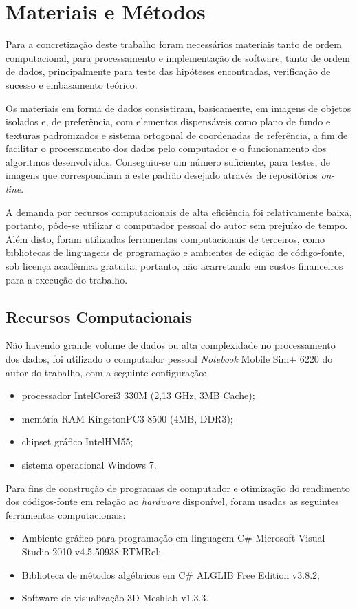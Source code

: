 \chapter{Materiais e Métodos}
	\label{materiaisEMetodos}

	Para a concretização deste trabalho foram necessários materiais tanto de ordem computacional, para processamento e implementação de software, tanto de ordem de dados, principalmente para teste das hipóteses encontradas, verificação de sucesso e embasamento teórico. 
	
	Os materiais em forma de dados consistiram, basicamente, em imagens de objetos isolados e, de preferência, com elementos dispensáveis como plano de fundo e texturas padronizados e sistema ortogonal de coordenadas de referência, a fim de facilitar o processamento dos dados pelo computador e o funcionamento dos algoritmos desenvolvidos. Conseguiu-se um número suficiente, para testes, de imagens que correspondiam a este padrão desejado através de repositórios \textit{on-line}. 
	
	A demanda por recursos computacionais de alta eficiência foi relativamente baixa, portanto, pôde-se utilizar o computador pessoal do autor sem prejuízo de tempo. Além disto, foram utilizadas ferramentas computacionais de terceiros, como bibliotecas de linguagens de programação e ambientes de edição de código-fonte, sob licença acadêmica gratuita, portanto, não acarretando em custos financeiros para a execução do trabalho.
	
\section{Recursos Computacionais}

	Não havendo grande volume de dados ou alta complexidade no processamento dos dados, foi utilizado o computador pessoal \textit{Notebook} Mobile Sim+ 6220 do autor do trabalho, com a seguinte configuração:
\begin{itemize}
	\item processador Intel\textregistered Core\textregistered i3 330M (2,13 GHz, 3MB Cache);
	\item memória RAM Kingston\textregistered PC3-8500 (4MB, DDR3);
	\item chipset gráfico Intel\textregistered HM55;
	\item sistema operacional Windows 7\textregistered.
\end{itemize}

	Para fins de construção de programas de computador e otimização do rendimento dos códigos-fonte em relação ao \textit{hardware} disponível, foram usadas as seguintes ferramentas computacionais:
\begin{itemize}
	\item Ambiente gráfico para programação em linguagem C\# Microsoft Visual Studio 2010 v4.5.50938 RTMRel\textregistered;
	\item Biblioteca de métodos algébricos em C\# ALGLIB Free Edition v3.8.2;
	\item Software de visualização 3D Meshlab v1.3.3.
\end{itemize}

